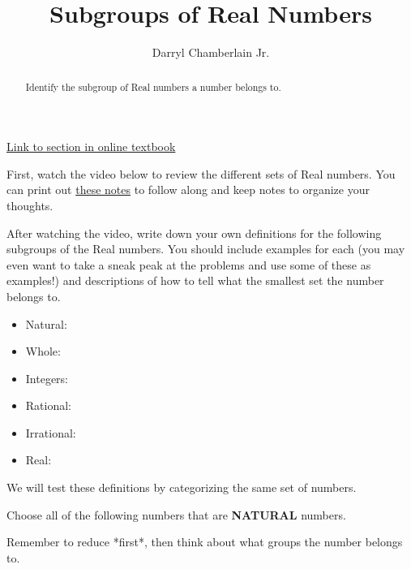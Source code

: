 \documentclass{ximera}
\author{Darryl Chamberlain Jr.}
\title{Subgroups of Real Numbers}
\begin{document}
\begin{abstract}
Identify the subgroup of Real numbers a number belongs to.
\end{abstract}
\maketitle

\href{https://cnx.org/contents/mwjClAV_@8.1:0KhpF2RH@23/Real-Numbers-Algebra-Essentials}{Link to section in online textbook}

First, watch the video below to review the different sets of Real numbers. You can print out \href{http://people.clas.ufl.edu/dchamberlain31/files/Objective-1-Subgroups-of-Real-Numbers.pdf}{these notes} to follow along and keep notes to organize your thoughts.


After watching the video, write down your own definitions for the following subgroups of the Real numbers. You should include examples for each (you may even want to take a sneak peak at the problems and use some of these as examples!) and descriptions of how to tell what the smallest set the number belongs to.

\begin{itemize}
\item Natural:
\item Whole:
\item Integers:
\item Rational:
\item Irrational:
\item Real:
\end{itemize}

We will test these definitions by categorizing the same set of numbers.

\begin{exercise}
Choose all of the following numbers that are \textbf{NATURAL} numbers.
  \begin{selectAll}
  \end{selectAll}

\begin{hint}
	Remember to reduce *first*, then think about what groups the number belongs to.
\end{hint}
\end{exercise}
\end{document}

